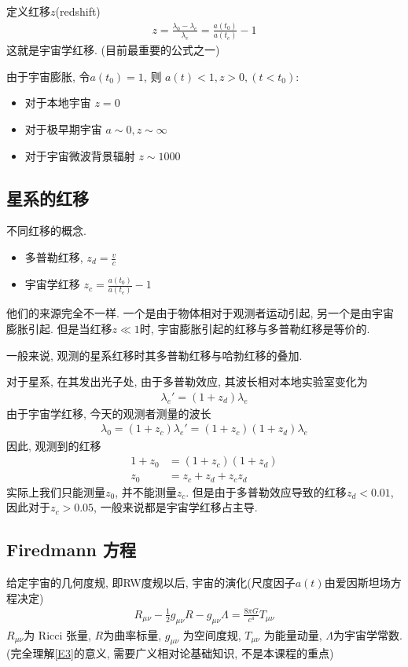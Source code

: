 定义红移$z$(redshift)
\begin{align}
    z=\frac{\lambda_0-\lambda_e}{\lambda_e}=\frac{a(t_0)}{a(t_e)}-1 \label{E2}
\end{align}
这就是宇宙学红移. (目前最重要的公式之一)

由于宇宙膨胀, 令$a(t_0)=1$, 则 $a(t)<1, z>0, (t<t_0)$:
\begin{itemize}\small
    \item 对于本地宇宙 $z=0$
    \item 对于极早期宇宙 $a\sim 0, z\sim \infty$
    \item 对于宇宙微波背景辐射 $z\sim 1000$
\end{itemize}

\subsection{星系的红移}
不同红移的概念. 
\begin{itemize}\small
    \item 多普勒红移, $z_d=\frac{v}{c}$
    \item 宇宙学红移 $z_c=\frac{a(t_0)}{a(t_e)}-1$
\end{itemize}
他们的来源完全不一样. 一个是由于物体相对于观测者运动引起, 另一个是由宇宙膨胀引起. 但是当红移$z\ll 1$时, 宇宙膨胀引起的红移与多普勒红移是等价的. 

一般来说, 观测的星系红移时其多普勒红移与哈勃红移的叠加. 

对于星系, 在其发出光子处, 由于多普勒效应, 其波长相对本地实验室变化为 
\begin{align*}
    \lambda_e'=(1+z_d)\lambda_e
\end{align*}
由于宇宙学红移, 今天的观测者测量的波长
\begin{align*}
    \lambda_0=(1+z_c)\lambda_e'=(1+z_c)(1+z_d)\lambda_e
\end{align*}
因此, 观测到的红移
\begin{align*}
    1+z_0&=(1+z_c)(1+z_d)\\
    z_0&=z_c+z_d +z_c z_d
\end{align*}
实际上我们只能测量$z_0$, 并不能测量$z_c$. 但是由于多普勒效应导致的红移$z_d<0.01$, 因此对于$z_c>0.05$, 一般来说都是宇宙学红移占主导. 

\subsection{Firedmann 方程}
给定宇宙的几何度规, 即RW度规以后, 宇宙的演化(尺度因子$a(t)$由爱因斯坦场方程决定)
\begin{align}
    R_{\mu\nu}-\frac{1}{2}g_{\mu\nu}R-g_{\mu\nu}\Lambda=\frac{8\pi G}{c^4}T_{\mu\nu}\label{E3}
\end{align}
$R_{\mu\nu}$为 Ricci 张量, $R$为曲率标量, $g_{\mu\nu}$ 为空间度规, $T_{\mu\nu}$ 为能量动量, $\Lambda$为宇宙学常数. (完全理解\ref{E3}的意义, 需要广义相对论基础知识, 不是本课程的重点)

